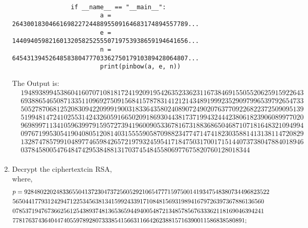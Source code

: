 \documentclass{article}
\theoremstyle{break}
\begin{document}
\begin{enumerate}
\begin{lstlisting}
                
                if __name__ == "__main__":
                        a = 264300183046616982272448895509164683174894557789...
                        e = 144094059821601320582525550719753938659194641656...
                        n = 645431394526485838047770336275017910389428064807...
                        print(pinbow(a, e, n))
        \end{lstlisting}
        The Output is: \\
        \[
        \begin{aligned}
                &1948938994538604160707108181724192091954263523362311673846915505520625915922643\\
                &6938865465087133511096927509156841578783141212143489199923529097996539792654733\\
                &5052787068125208309422099919003183364358024089072490207637709226822372509095139\\
                &5199481472410255314243260591665020918693044381737199432444238061823906089977020\\
                &9698997113410596399791595727394196009053367816731883686504687107181648321094994\\
                &0976719953054190408051208140315555905870988234774714741823035881413138114720829\\
                &1328747857991048977465984265721979324595417184750317001715144073738047884018946\\
                &0378458005476484742953848813170374548455806977675820760128018344\\
        \end{aligned}
        \]
        \newpage
        \item Decrypt the ciphertextcin RSA, \\
        where,\\
        \[     
                \begin{aligned}
                        &p=92848022024833655041372304737256052921065477715975001419347548380734496823522\\
                        &5650441779312429471225345638134159924339171084815693198941679726397367886136560\\
                        &0785371947673662561254389374813653659449400548721348578567633362118169046394241\\
                        &7781763743640447405597892807333854156631166426238815716390011586838580891;\\
                        \leavevmode\\

\end{aligned}\]
\end{enumerate}
\end{document}

